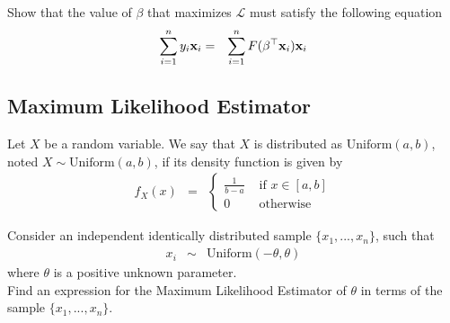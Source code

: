Show that the value of $\beta$ that maximizes $\mathcal{L}$ must satisfy the following equation
\begin{eqnarray}
\sum_{i=1}^n y_i {\bf x}_i & = &  \sum_{i=1}^n F(\beta^\top {\bf x}_i) {\bf x}_i
\end{eqnarray}


\subsection{Maximum Likelihood Estimator}
Let $X$ be a random variable. We say that $X$ is distributed as $\text{Uniform}(a,b)$, noted $X \sim \text{Uniform}(a,b)$, if its density function is given by
\begin{eqnarray}
f_X(x) & = & \left\{ \begin{array}{ll} \frac{1}{b-a} & \text{ if } x \in [a,b]
\\ 0 & \text{ otherwise} \end{array} \right. \end{eqnarray}


Consider an independent identically distributed sample $\{ x_1, ..., x_n\}$, such that
\begin{eqnarray}
x_i & \sim & \text{Uniform}(-\theta, \theta)
\end{eqnarray}
where $\theta$ is a positive unknown parameter. \\
Find an expression for the Maximum Likelihood Estimator of $\theta$ in terms of the sample $\{ x_1, ..., x_n\}$.
